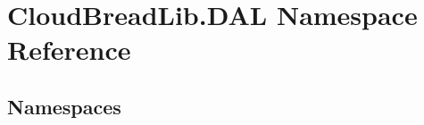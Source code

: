 \hypertarget{namespace_cloud_bread_lib_1_1_d_a_l}{}\section{Cloud\+Bread\+Lib.\+D\+AL Namespace Reference}
\label{namespace_cloud_bread_lib_1_1_d_a_l}
\subsection*{Namespaces}
\begin{DoxyCompactItemize}
\end{DoxyCompactItemize}
